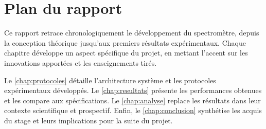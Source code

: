 \section{Plan du rapport}

Ce rapport retrace chronologiquement le développement du spectromètre, depuis la conception théorique jusqu'aux premiers résultats expérimentaux. Chaque chapitre développe un aspect spécifique du projet, en mettant l'accent sur les innovations apportées et les enseignements tirés.

Le \cref{chap:protocoles} détaille l'architecture système et les protocoles expérimentaux développés. Le \cref{chap:resultats} présente les performances obtenues et les compare aux spécifications. Le \cref{chap:analyse} replace les résultats dans leur contexte scientifique et prospectif. Enfin, le \cref{chap:conclusion} synthétise les acquis du stage et leurs implications pour la suite du projet.